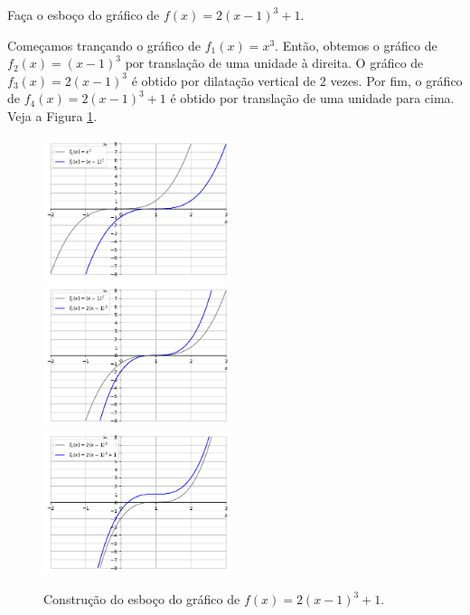 \begin{exeresol}
  Faça o esboço do gráfico de $f(x) = 2(x-1)^3+1$.
\end{exeresol}
\begin{resol}
  Começamos trançando o gráfico de $f_1(x) = x^3$. Então, obtemos o gráfico de $f_2(x) = (x-1)^3$ por translação de uma unidade à direita. O gráfico de $f_3(x) = 2(x-1)^3$ é obtido por dilatação vertical de 2 vezes. Por fim, o gráfico de $f_4(x) = 2(x-1)^3+1$ é obtido por translação de uma unidade para cima. Veja a Figura \ref{fig:exeresol_opfun_graf}.

  \begin{figure}[H]
    \centering
    \includegraphics[width=0.49\textwidth]{./cap_funcao/dados/fig_exeresol_opfun_graf/fig_exeresol_opfun_graf_1}~
    \includegraphics[width=0.49\textwidth]{./cap_funcao/dados/fig_exeresol_opfun_graf/fig_exeresol_opfun_graf_2}\\
    \includegraphics[width=0.49\textwidth]{./cap_funcao/dados/fig_exeresol_opfun_graf/fig_exeresol_opfun_graf_3}
    \caption{Construção do esboço do gráfico de $f(x) = 2(x-1)^3+1$.}
    \label{fig:exeresol_opfun_graf}
  \end{figure}
\end{resol}

